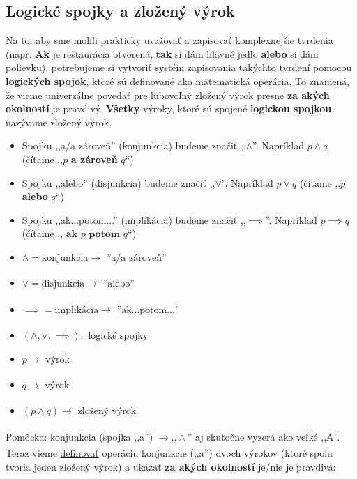 \documentclass{article}
\begin{document}
\subsection{Logické spojky a zložený výrok}
Na to, aby sme mohli prakticky uvažovať a zapisovať komplexnejšie tvrdenia (napr. \underline{\textbf{Ak}} je reštaurácia otvorená, \underline{\textbf{tak}} si dám hlavné jedlo \underline{\textbf{alebo}} si dám polievku), potrebujeme si vytvoriť systém zapisovania takýchto tvrdení pomocou \textbf{logických spojok}, ktoré sú definované ako matematická operácia. To znamená, že vieme univerzálne povedať pre ľubovoľný zložený výrok presne \textbf{za akých okolností} je pravdivý. \textbf{Všetky} výroky, ktoré sú spojené \textbf{logickou spojkou}, nazývame zložený výrok. 
\begin{itemize}
\vspace{5mm}
    \item Spojku ,,a/a zároveň'' (konjunkcia) budeme značiť ,,$\land$''. Napríklad $p \land q$ (čítame ,,$p$ \textbf{ a zároveň } $q$``)
    \item Spojku ,,alebo'' (disjunkcia) budeme značiť ,,$\lor$''. Napríklad $p \lor q$ (čítame ,,$p$ \textbf{ alebo } $q$``)
    \item Spojku ,,ak...potom...'' (implikácia) budeme značiť ,,$\implies$''. Napríklad $p \implies q$ (čítame ,,$\textbf{ ak } p \textbf{ potom } q$``)
    \item $\land = \text{konjunkcia} \xrightarrow[]{} \text{ ''a/a zároveň'' }$
    \item $\lor = \text{disjunkcia} \xrightarrow[]{} \text{ ''alebo'' }$
    \item $\implies = \text{implikácia} \xrightarrow[]{} \text{ ''ak...potom...'' }$
    \item $(\land, \lor, \implies):$ logické spojky
    \item $p \xrightarrow[]{}$ výrok 
    \item $q \xrightarrow[]{}$ výrok
    \item $(p \land q) \xrightarrow[]{}$ zložený výrok 
\end{itemize}
\vspace{5mm}
Pomôcka: konjunkcia (spojka ,,a'') $\xrightarrow[]{} \text{,,}\land \text{''}$ aj skutočne vyzerá ako veľké ,,A''.
\newpage
\vspace{5mm}
Teraz vieme \underline{definovať} operáciu konjunkcie (,,a'') dvoch výrokov (ktoré spolu tvoria jeden zložený výrok) a ukázať \textbf{za akých okolností} je/nie je pravdivá:
\vspace{5mm}
\end{document}
